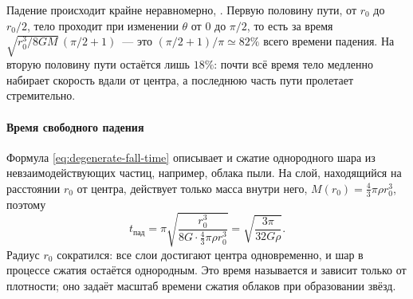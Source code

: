 Падение происходит крайне неравномерно, . Первую половину пути, от $r_0$ до $r_0 / 2$, тело проходит при изменении $\theta$ от $0$ до $\pi / 2$, то есть за время $\sqrt{r_0^3 / 8GM}\,(\pi / 2 + 1)$~--- это $(\pi / 2 + 1) / \pi \simeq 82\%$ всего времени падения. На вторую половину пути остаётся лишь $18\%$: почти всё время тело медленно набирает скорость вдали от центра, а последнюю часть пути пролетает стремительно.

\paragraph{Время свободного падения} Формула \eqref{eq:degenerate-fall-time} описывает и сжатие однородного шара из невзаимодействующих частиц, например, облака пыли. На слой, находящийся на расстоянии $r_0$ от центра, действует только масса внутри него, $M(r_0) = \frac{4}{3}\pi\rho r_0^3$, поэтому
\begin{equation}
    t_\text{пад} = \pi\sqrt{\frac{r_0^3}{8G \cdot \frac{4}{3}\pi\rho r_0^3}} = \sqrt{\frac{3\pi}{32 G\rho}}.
    \label{eq:free-fall-time}
\end{equation}
Радиус $r_0$ сократился: все слои достигают центра одновременно, и шар в процессе сжатия остаётся однородным. Это время называется  и зависит только от плотности; оно задаёт масштаб времени сжатия облаков при образовании звёзд.
